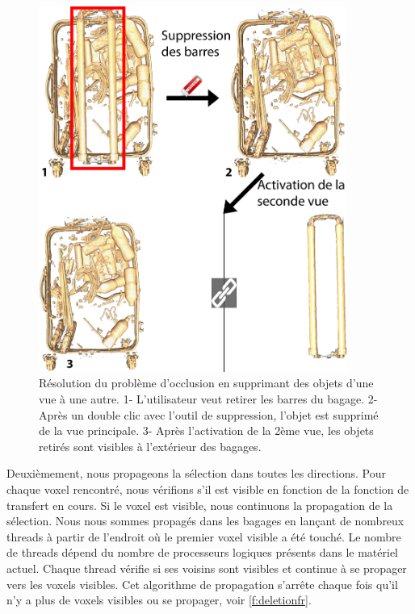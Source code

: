 \begin{figure}
\centering   
 \includegraphics[width=0.9\textwidth]{Figures/deletionfr.png}
	\caption[ Résolution du problème d'occlusion en supprimant des objets d'une vue à une autre.]{Résolution du problème d'occlusion en supprimant des objets d'une vue à une autre. 1- L'utilisateur veut retirer les barres du bagage. 2- Après un double clic avec l'outil de suppression, l'objet est supprimé de la vue principale. 3- Après l'activation de la 2ème vue, les objets retirés sont visibles à l'extérieur des bagages.}
	\label{f:deletionfr}
\end{figure}

Deuxièmement, nous propageons la sélection dans toutes les directions. Pour chaque voxel rencontré, nous vérifions s'il est visible en fonction de la fonction de transfert en cours. Si le voxel est visible, nous continuons la propagation de la sélection. Nous nous sommes propagés dans les bagages en lançant de nombreux threads à partir de l'endroit où le premier voxel visible a été touché. Le nombre de threads dépend du nombre de processeurs logiques présents dans le matériel actuel. Chaque thread vérifie si ses voisins sont visibles et continue à se propager vers les voxels visibles. Cet algorithme de propagation s'arrête chaque fois qu'il n'y a plus de voxels visibles ou se propager, voir \autoref{f:deletionfr}.




